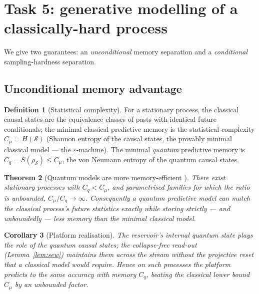 \documentclass[11pt]{article}
\theoremstyle{plain}
\newtheorem{theorem}{Theorem}[section]
\newtheorem{corollary}[theorem]{Corollary}
\theoremstyle{definition}
\newtheorem{definition}[theorem]{Definition}
\theoremstyle{remark}
\newcommand{\eps}{\varepsilon}
\begin{document}
\section{Task 5: generative modelling of a classically-hard process}\label{sec:task5}

We give two guarantees: an \emph{unconditional} memory separation and a \emph{conditional} sampling-hardness separation.

\subsection{Unconditional memory advantage}
\begin{definition}[Statistical complexity]
For a stationary process, the classical causal states are the equivalence classes of pasts with identical future conditionals; the minimal classical predictive memory is the statistical complexity $C_\mu=H(\mathcal S)$ (Shannon entropy of the causal states, the provably minimal classical model --- the $\eps$-machine). The minimal \emph{quantum} predictive memory is $C_q=S(\rho_{\mathcal S})\le C_\mu$, the von Neumann entropy of the quantum causal states.
\end{definition}

\begin{theorem}[Quantum models are more memory-efficient \cite{Gu,Garner}]\label{thm:t5mem}
There exist stationary processes with $C_q<C_\mu$, and parametrised families for which the ratio is unbounded, $C_\mu/C_q\to\infty$. Consequently a quantum predictive model can match the classical process's future statistics exactly while storing strictly --- and unboundedly --- less memory than the minimal classical model.
\end{theorem}

\begin{corollary}[Platform realisation]\label{cor:t5mem}
The reservoir's internal quantum state plays the role of the quantum causal states; the collapse-free read-out (Lemma~\ref{lem:sew}) maintains them across the stream without the projective reset that a classical model would require. Hence on such processes the platform predicts to the same accuracy with memory $C_q$, beating the classical lower bound $C_\mu$ by an unbounded factor.
\end{corollary}
\end{document}

